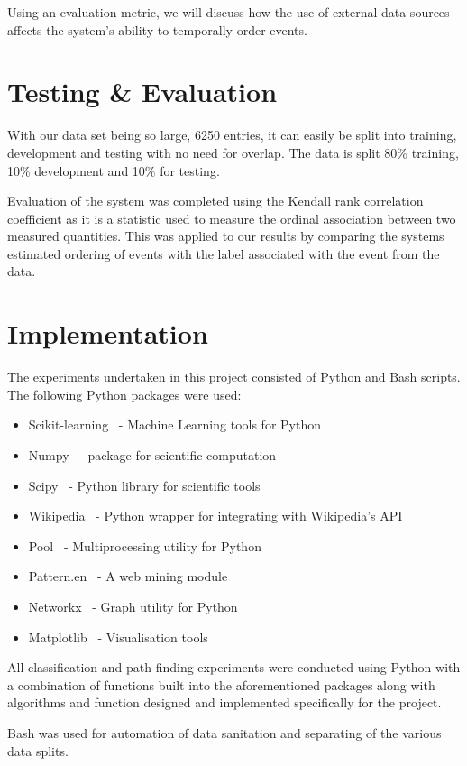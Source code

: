 \documentclass[bsc,frontabs,twoside,singlespacing,parskip,deptreport]{infthesis}     %
\begin{document}
Using an evaluation metric, we will discuss how the use of external data sources affects the system's ability to
temporally order events.

\section{Testing \& Evaluation}
With our data set being so large, 6250 entries, it can
easily be split into training, development and testing with no
need for overlap. The data is split 80\% training,
10\% development and 10\% for testing.

Evaluation of the system was completed using the
Kendall rank correlation coefficient as it is a statistic
used to measure the ordinal association between two
measured quantities. This was applied to our results
by comparing the systems estimated ordering of events
with the label associated with the event from the data.

\section{Implementation}
The experiments undertaken in this project consisted of Python and Bash scripts.
The following Python packages were used:
\begin{itemize}
\item Scikit-learning~\cite{scikit-learn} - Machine Learning tools for Python
\item Numpy~\cite{numpy} - package for scientific computation
\item Scipy~\cite{scipy} - Python library for scientific tools
\item Wikipedia~\cite{wikipediaAPI} - Python wrapper for integrating with Wikipedia's API
\item Pool~\cite{pool} - Multiprocessing utility for Python
\item Pattern.en~\cite{pattern} - A web mining module 
\item Networkx~\cite{networkx} - Graph utility for Python
\item Matplotlib~\cite{matplotlib} - Visualisation tools
\end{itemize}
All classification and path-finding experiments were conducted using Python with a combination of
functions built into the aforementioned packages along with algorithms and function designed and implemented
specifically for the project.

Bash was used for automation of data sanitation and separating of the various data splits. 
\end{document}
